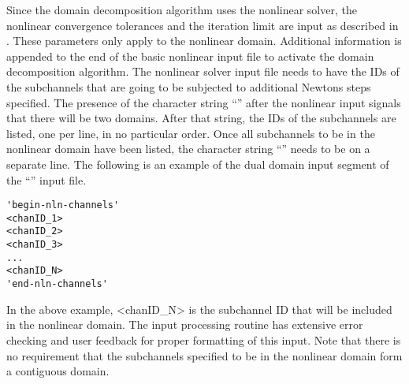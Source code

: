 Since the domain decomposition algorithm uses the nonlinear solver, the nonlinear convergence tolerances and the iteration limit are input as described in .
These parameters only apply to the nonlinear domain.
Additional information is appended to the end of the basic nonlinear input file to activate the domain decomposition algorithm.
The nonlinear solver input file needs to have the IDs of the subchannels that are going to be subjected to additional Newtons steps specified.
The presence of the character string ``'' after the nonlinear input signals that there will be two domains.
After that string, the IDs of the subchannels are listed, one per line, in no particular order.
Once all subchannels to be in the nonlinear domain have been listed, the character string ``'' needs to be on a separate line.
The following is an example of the dual domain input segment of the ``'' input file.

{
\singlespace
\begin{verbatim}
'begin-nln-channels'
<chanID_1>
<chanID_2>
<chanID_3>
...
<chanID_N>
'end-nln-channels'
\end{verbatim}
}

In the above example, <chanID\_N> is the subchannel ID that will be included in the nonlinear domain.
The input processing routine has extensive error checking and user feedback for proper formatting of this input.
Note that there is no requirement that the subchannels specified to be in the nonlinear domain form a contiguous domain.


